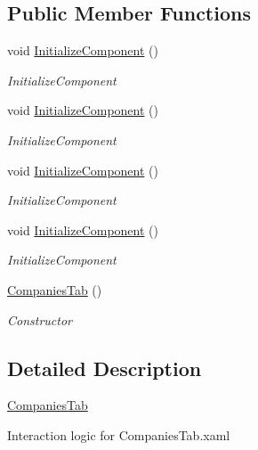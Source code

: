 \subsection*{Public Member Functions}
\begin{DoxyCompactItemize}
\item 
void \hyperlink{class_baudi_1_1_client_1_1_view_1_1_tabs_1_1_companies_tab_a5ad4bf01743303ce1ff47f1269e5acc1}{Initialize\+Component} ()
\begin{DoxyCompactList}\small\item\em Initialize\+Component \end{DoxyCompactList}\item 
void \hyperlink{class_baudi_1_1_client_1_1_view_1_1_tabs_1_1_companies_tab_a5ad4bf01743303ce1ff47f1269e5acc1}{Initialize\+Component} ()
\begin{DoxyCompactList}\small\item\em Initialize\+Component \end{DoxyCompactList}\item 
void \hyperlink{class_baudi_1_1_client_1_1_view_1_1_tabs_1_1_companies_tab_a5ad4bf01743303ce1ff47f1269e5acc1}{Initialize\+Component} ()
\begin{DoxyCompactList}\small\item\em Initialize\+Component \end{DoxyCompactList}\item 
void \hyperlink{class_baudi_1_1_client_1_1_view_1_1_tabs_1_1_companies_tab_a5ad4bf01743303ce1ff47f1269e5acc1}{Initialize\+Component} ()
\begin{DoxyCompactList}\small\item\em Initialize\+Component \end{DoxyCompactList}\item 
\hyperlink{class_baudi_1_1_client_1_1_view_1_1_tabs_1_1_companies_tab_a17f66a87a4f235c9d9f542d2a6c1495e}{Companies\+Tab} ()
\begin{DoxyCompactList}\small\item\em Constructor \end{DoxyCompactList}\end{DoxyCompactItemize}


\subsection{Detailed Description}
\hyperlink{class_baudi_1_1_client_1_1_view_1_1_tabs_1_1_companies_tab}{Companies\+Tab} 

Interaction logic for Companies\+Tab.\+xaml 


